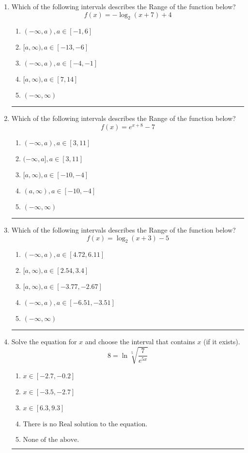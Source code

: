 \documentclass[14pt]{extbook}
\newcommand{\litem}[1]{\item#1\hspace*{-1cm}\rule{\textwidth}{0.4pt}}
\begin{document}
\begin{enumerate}
\litem{
Which of the following intervals describes the Range of the function below?\[ f(x) = -\log_2{(x+7)}+4 \]\begin{enumerate}[label=\Alph*.]
\item \( (-\infty, a), a \in [-1, 6] \)
\item \( [a, \infty), a \in [-13, -6] \)
\item \( (-\infty, a), a \in [-4, -1] \)
\item \( [a, \infty), a \in [7, 14] \)
\item \( (-\infty, \infty) \)

\end{enumerate} }
\litem{
Which of the following intervals describes the Range of the function below?\[ f(x) = e^{x+8}-7 \]\begin{enumerate}[label=\Alph*.]
\item \( (-\infty, a), a \in [3, 11] \)
\item \( (-\infty, a], a \in [3, 11] \)
\item \( [a, \infty), a \in [-10, -4] \)
\item \( (a, \infty), a \in [-10, -4] \)
\item \( (-\infty, \infty) \)

\end{enumerate} }
\litem{
Which of the following intervals describes the Range of the function below?\[ f(x) = \log_2{(x+3)}-5 \]\begin{enumerate}[label=\Alph*.]
\item \( (-\infty, a), a \in [4.72, 6.11] \)
\item \( [a, \infty), a \in [2.54, 3.4] \)
\item \( [a, \infty), a \in [-3.77, -2.67] \)
\item \( (-\infty, a), a \in [-6.51, -3.51] \)
\item \( (-\infty, \infty) \)

\end{enumerate} }
\litem{
 Solve the equation for $x$ and choose the interval that contains $x$ (if it exists).\[  8 = \ln{\sqrt[5]{\frac{7}{e^{5x}}}} \]\begin{enumerate}[label=\Alph*.]
\item \( x \in [-2.7, -0.2] \)
\item \( x \in [-3.5, -2.7] \)
\item \( x \in [6.3, 9.3] \)
\item \( \text{There is no Real solution to the equation.} \)
\item \( \text{None of the above.} \)


\end{enumerate}}
\end{enumerate}
\end{document}
